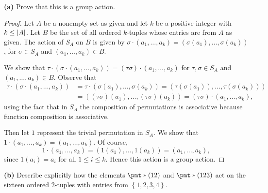 \documentclass[11pt]{article}
\newcommand{\br}[1]{\left(#1\right)}
\newcommand{\cbr}[1]{\left\{#1\right\}}
\begin{document}
\begin{enumerate}
    \textbf{(a)} Prove that this is a group action. \begin{proof} Let $A$ be a nonempty set as given and let $k$ be a positive integer with $k\leq \abs{A}$. Let $B$ be the set of all ordered $k$-tuples whose entries are from $A$ as given. The action of $S_A$ on $B$ is given by $\sigma\cdot\br{a_1,\dots,a_k} = \br{\sigma(a_1),\dots,\sigma(a_k)}$, for $\sigma\in S_A$ and $\br{a_1,\dots,a_k} \in B$.

    We show that $\tau\cdot(\sigma\cdot \br{a_1,\dots,a_k}) = (\tau\sigma)\cdot \br{a_1,\dots,a_k}$ for $\tau, \sigma\in S_A$ and $\br{a_1,\dots,a_k} \in B$. Observe that \begin{align*}\tau\cdot(\sigma\cdot \br{a_1,\dots,a_k}) &= \tau \cdot \br{\sigma(a_1),\dots,\sigma(a_k)} = \br{\tau(\sigma(a_1)),\dots,\tau(\sigma(a_k))} \\ 
    &= \br{(\tau\sigma)(a_1),\dots,(\tau\sigma)(a_k)} = (\tau\sigma)\cdot \br{a_1,\dots,a_k},\end{align*} using the fact that in $S_A$ the composition of permutations is associative because function composition is associative.

    Then let $1$ represent the trivial permutation in $S_A$. We show that $1\cdot \br{a_1,\dots,a_k} = \br{a_1,\dots,a_k}$. Of course, \[1\cdot \br{a_1,\dots,a_k} = \br{1(a_1),\dots,1(a_k)} = \br{a_1,\dots,a_k},\] since $1(a_i) = a_i$ for all $1\leq i\leq k$. Hence this action is a group action.      
    \end{proof}

    \textbf{(b)} Describe explicitly how the elements $\pmt*{(12)}$ and $\pmt*{(123)}$ act on the sixteen ordered $2$-tuples with entries from $\cbr{1,2,3,4}$.


\end{enumerate}
\end{document}
